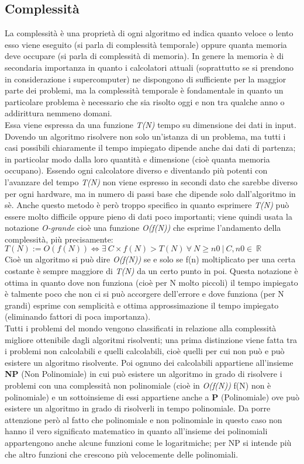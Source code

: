 \subsection{Complessità}
La complessità è una proprietà di ogni algoritmo ed indica quanto veloce o lento esso viene eseguito (si parla di complessità temporale) oppure quanta memoria deve occupare (si parla di complessità di memoria).
In genere la memoria è di secondaria importanza in quanto i calcolatori attuali (soprattutto se si prendono in considerazione i supercomputer) ne dispongono di sufficiente per la maggior parte dei problemi, ma la complessità temporale è fondamentale in quanto un particolare problema è necessario che sia risolto oggi e non tra qualche anno o addirittura nemmeno domani.\\
Essa viene espressa da una funzione \textit{T(N)} tempo su dimensione dei dati in input. Dovendo un algoritmo risolvere non solo un'istanza di un problema, ma tutti i casi possibili chiaramente il tempo impiegato dipende anche dai dati di partenza; in particolar modo dalla loro quantità e dimensione (cioè quanta memoria occupano). Essendo ogni calcolatore diverso e diventando più potenti con l'avanzare del tempo \textit{T(N)} non viene espresso in secondi dato che sarebbe diverso per ogni hardware, ma in numero di passi base che dipende solo dall'algoritmo in sè. Anche questo metodo è però troppo specifico in quanto esprimere \textit{T(N)} può essere molto difficile oppure pieno di dati poco importanti; viene quindi usata la notazione \textit{O-grande} cioè una funzione \textit{O(f(N))} che esprime l'andamento della complessità, più precisamente:
$T(N) := O(f(N)) \iff \exists \ C\times f(N) > T(N)\ \forall \ N \geq n0 \ | \ C,n0 \in \ \mathbb{R} $\\
Cioè un algoritmo si può dire \textit{O(f(N))} se e solo se f(n) moltiplicato per una certa costante è sempre maggiore di \textit{T(N)} da un certo punto in poi. Questa notazione è ottima in quanto dove non funziona (cioè per N molto piccoli) il tempo impiegato è talmente poco che non ci si può accorgere dell'errore e dove funziona (per N grandi) esprime con semplicità e ottima approssimazione il tempo impiegato (eliminando fattori di poca importanza).\\
Tutti i problemi del mondo vengono classificati in relazione alla complessità migliore ottenibile dagli algoritmi risolventi; una prima distinzione viene fatta tra i problemi non calcolabili e quelli calcolabili, cioè quelli per cui non può e può esistere un algoritmo risolvente. Poi ognuno dei calcolabili appartiene all'insieme \textbf{NP} (Non Polinomiale) in cui può esistere un algoritmo in grado di risolvere i problemi con una complessità non polinomiale (cioè in \textit{O(f(N))} f(N) non è polinomiale) e un sottoinsieme di essi appartiene anche a \textbf{P} (Polinomiale) ove può esistere un algoritmo in grado di risolverli in tempo polinomiale. Da porre attenzione però al fatto che polinomiale e non polinomiale in questo caso non hanno il vero significato matematico in quanto all'insieme dei polinomiali appartengono anche alcune funzioni come le logaritmiche; per NP si intende più che altro funzioni che crescono più velocemente delle polinomiali.\\
